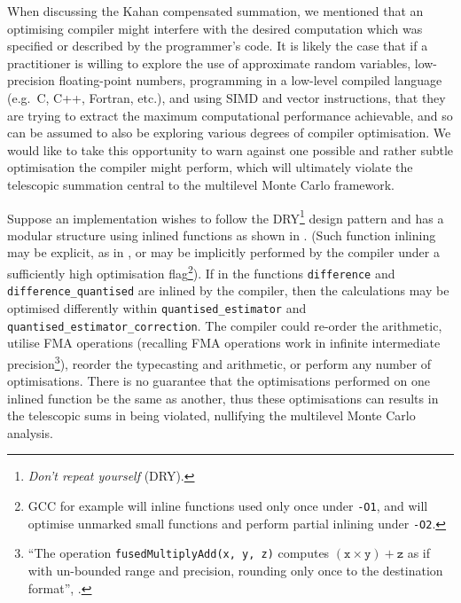 \documentclass[11pt,a4paper,twoside,english]{extarticle}
\begin{document}
When discussing the Kahan compensated summation, we mentioned that an optimising compiler might interfere with the desired computation which was specified or described by the programmer's code. It is likely the case that if a practitioner is willing to explore the use of approximate random variables, low-precision floating-point numbers, programming in a low-level compiled language (e.g.\ C, C++, Fortran, etc.), and using SIMD and vector instructions, that they are trying to extract the maximum computational performance achievable, and so can be assumed to also be exploring various degrees of compiler optimisation. We would like to take this opportunity to warn against one possible and rather subtle optimisation the compiler might perform, which will ultimately violate the telescopic summation central to the multilevel Monte Carlo framework. 

Suppose an implementation wishes to follow the DRY\footnote{\textit{Don't repeat yourself} (DRY).} design pattern and has a modular structure using inlined functions 
as shown in . (Such function inlining may be explicit, as in , or may be implicitly performed by the compiler under a sufficiently high optimisation flag\footnote{GCC for example will inline functions used only once under \verb|-O1|, and will optimise unmarked small functions and perform partial inlining under \verb|-O2|.}). If in  the functions \verb|difference| and \verb|difference_quantised| are inlined by the compiler, then the calculations may be optimised differently within  \verb|quantised_estimator| and \verb|quantised_estimator_correction|. The compiler could re-order the arithmetic, utilise FMA operations (recalling FMA operations work in infinite intermediate precision\footnote{``The operation \verb|fusedMultiplyAdd(x, y, z)| computes $ (\mathtt{x} \times \mathtt{y}) + \mathtt{z} $ as if with un-bounded range and precision, rounding only once to the destination format'', \citet[page~4, definition~2.1.28]{ieee2008ieee}.}), reorder the typecasting and arithmetic, or perform any number of optimisations. There is no guarantee that the optimisations performed on one inlined function be the same as another, thus these optimisations can results in the telescopic sums in  being violated, nullifying the multilevel Monte Carlo analysis. 
\end{document}
